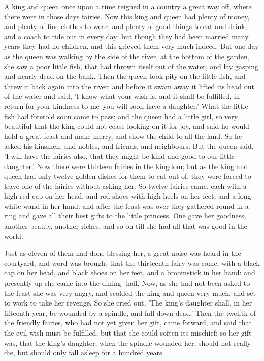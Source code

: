 \documentclass[12pt]{book}
\begin{document}
A king and queen once upon a time reigned in a country a great way
off, where there were in those days fairies. Now this king and queen
had plenty of money, and plenty of fine clothes to wear, and plenty of
good things to eat and drink, and a coach to ride out in every day:
but though they had been married many years they had no children, and
this grieved them very much indeed. But one day as the queen was
walking by the side of the river, at the bottom of the garden, she saw
a poor little fish, that had thrown itself out of the water, and lay
gasping and nearly dead on the bank. Then the queen took pity on the
little fish, and threw it back again into the river; and before it
swam away it lifted its head out of the water and said, 'I know what
your wish is, and it shall be fulfilled, in return for your kindness
to me--you will soon have a daughter.' What the little fish had
foretold soon came to pass; and the queen had a little girl, so very
beautiful that the king could not cease looking on it for joy, and
said he would hold a great feast and make merry, and show the child to
all the land. So he asked his kinsmen, and nobles, and friends, and
neighbours. But the queen said, 'I will have the fairies also, that
they might be kind and good to our little daughter.' Now there were
thirteen fairies in the kingdom; but as the king and queen had only
twelve golden dishes for them to eat out of, they were forced to leave
one of the fairies without asking her. So twelve fairies came, each
with a high red cap on her head, and red shoes with high heels on her
feet, and a long white wand in her hand: and after the feast was over
they gathered round in a ring and gave all their best gifts to the
little princess. One gave her goodness, another beauty, another
riches, and so on till she had all that was good in the world.

Just as eleven of them had done blessing her, a great noise was heard
in the courtyard, and word was brought that the thirteenth fairy was
come, with a black cap on her head, and black shoes on her feet, and a
broomstick in her hand: and presently up she came into the dining-
hall. Now, as she had not been asked to the feast she was very angry,
and scolded the king and queen very much, and set to work to take her
revenge. So she cried out, 'The king's daughter shall, in her
fifteenth year, be wounded by a spindle, and fall down dead.' Then the
twelfth of the friendly fairies, who had not yet given her gift, came
forward, and said that the evil wish must be fulfilled, but that she
could soften its mischief; so her gift was, that the king's daughter,
when the spindle wounded her, should not really die, but should only
fall asleep for a hundred years.
\end{document}
